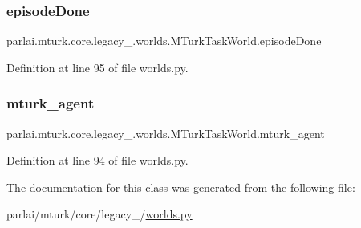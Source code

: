 \subsubsection{\texorpdfstring{episode\+Done}{episodeDone}}
{\footnotesize\ttfamily parlai.\+mturk.\+core.\+legacy\+\_.\+worlds.\+M\+Turk\+Task\+World.\+episode\+Done}



Definition at line 95 of file worlds.\+py.

\mbox{\label{classparlai_1_1mturk_1_1core_1_1legacy__2018_1_1worlds_1_1MTurkTaskWorld_a7c4f2ef7d7f0864848d45ec22b39def7}} 
\subsubsection{\texorpdfstring{mturk\+\_\+agent}{mturk\_agent}}
{\footnotesize\ttfamily parlai.\+mturk.\+core.\+legacy\+\_.\+worlds.\+M\+Turk\+Task\+World.\+mturk\+\_\+agent}



Definition at line 94 of file worlds.\+py.



The documentation for this class was generated from the following file\+:\begin{DoxyCompactItemize}
\item 
parlai/mturk/core/legacy\+\_/\hyperlink{parlai_2mturk_2core_2legacy__2018_2worlds_8py}{worlds.\+py}\end{DoxyCompactItemize}
